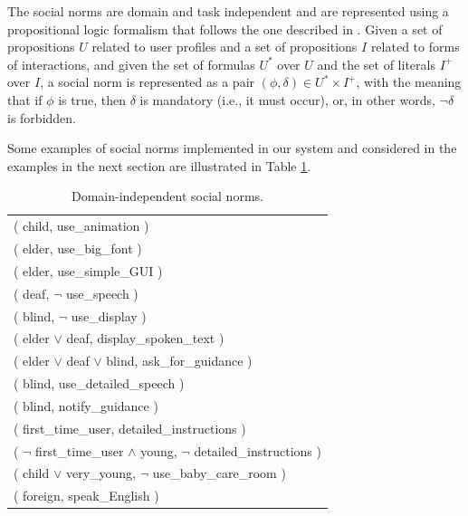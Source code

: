 The social norms are domain and task independent and are represented using a propositional logic formalism that follows the one described in \cite{BoPiTo09}. 
Given a set of propositions $U$ related to user profiles and a set of propositions $I$ related to forms of interactions, and given the set of formulas $U^{*}$ over $U$ and the set of literals $I^{+}$ over $I$,
a social norm is represented as a pair $(\phi,\delta) \in U^{*} \times I^{+}$, %
with the meaning that if $\phi$ is true, then $\delta$ is mandatory (i.e., it must occur), or, in other words, $\neg \delta$ is forbidden. 

Some examples of social norms implemented in our system and considered in the examples in the next section are illustrated in Table \ref{tab:socialnorms}. 


\begin{table}
\begin{center}
\begin{tabular}{|l|} \hline
( child, use\_animation ) \\ 
( elder, use\_big\_font ) \\ 
( elder, use\_simple\_GUI ) \\
( deaf, $\neg$ use\_speech ) \\
( blind, $\neg$ use\_display ) \\
( elder $\vee$ deaf, display\_spoken\_text ) \\ 
( elder $\vee$ deaf $\vee$ blind, ask\_for\_guidance ) \\
( blind, use\_detailed\_speech ) \\
( blind, notify\_guidance ) \\
( first\_time\_user, detailed\_instructions ) \\ 
( $\neg$ first\_time\_user $\wedge$ young, $\neg$ detailed\_instructions ) \\ 
( child $\vee$ very\_young, $\neg$ use\_baby\_care\_room ) \\ 
( foreign, speak\_English ) \\ 
\hline
\end{tabular}
\caption{Domain-independent social norms.}
\label{tab:socialnorms}
\end{center}
\vspace{-0.8cm}
\end{table}

